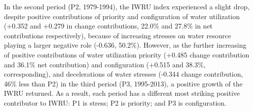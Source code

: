 \documentclass[9pt, twocolumn, twoside, lineno]{pnas-new}
\begin{document}
In the second period (P2, 1979-1994), the IWRU index experienced a slight drop, despite positive contributions of priority and configuration of water utilization (+0.352 and +0.279 in change contributions, 22.0\% and 27.8\% in net contributions respectively), because of increasing stresses on water resource playing a larger negative role (-0.636, 50.2\%). 
However, as the further increasing of positive contributions of water utilization priority (+0.485 change contribution and 36.1\% net contribution) and configuration (+0.515 and 38.3\%, corresponding), and decelerations of water stresses (-0.344 change contribution, 46\% less than P2) in the third period (P3, 1995-2013), a positive growth of the IWRU returned.
As a result, each period has a different most striking positive contributor to IWRU: P1 is stress; P2 is priority; and P3 is configuration.
\end{document}
